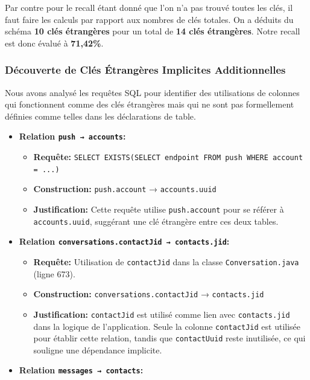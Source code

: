 \documentclass[a4paper,11pt]{article}
\begin{document}
Par contre pour le recall étant donné que l'on n'a pas trouvé toutes les clés, il faut faire les calculs par rapport aux nombres de clés totales.
On a déduits du schéma \textbf{10 clés étrangères} pour un total de \textbf{14 clés étrangères}. Notre recall est donc évalué à \textbf{71,42\%}.

\subsubsection*{Découverte de Clés Étrangères Implicites Additionnelles}
Nous avons analysé les requêtes SQL pour identifier des utilisations de colonnes qui fonctionnent comme des clés étrangères mais qui ne sont pas formellement définies comme telles dans les déclarations de table.

\begin{itemize}
    \item \textbf{Relation \texttt{push → accounts}:}
    \begin{itemize}
        \item \textbf{Requête:} \texttt{SELECT EXISTS(SELECT endpoint FROM push WHERE account = ...)}
        \item \textbf{Construction:} \texttt{push.account} → \texttt{accounts.uuid}
        \item \textbf{Justification:} Cette requête utilise \texttt{push.account} pour se référer à \texttt{accounts.uuid}, suggérant une clé étrangère entre ces deux tables. 
    \end{itemize}
    \item \textbf{Relation \texttt{conversations.contactJid → contacts.jid}:}
    \begin{itemize}
        \item \textbf{Requête:} Utilisation de \texttt{contactJid} dans la classe \texttt{Conversation.java} (ligne 673).
        \item \textbf{Construction:} \texttt{conversations.contactJid} → \texttt{contacts.jid}
        \item \textbf{Justification:} \texttt{contactJid} est utilisé comme lien avec \texttt{contacts.jid} dans la logique de l'application. Seule la colonne \texttt{contactJid} est utilisée pour établir cette relation, tandis que \texttt{contactUuid} reste inutilisée, ce qui souligne une dépendance implicite.
    \end{itemize}
    \item \textbf{Relation \texttt{messages → contacts}:}
    \begin{itemize}

\end{itemize}
\end{itemize}
\end{document}
